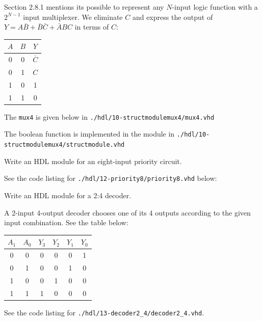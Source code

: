 \documentclass[12pt]{article}
\newenvironment{ex}[2][Exercise]{\begin{trivlist}
		\item[\hskip \labelsep {\bfseries #1}\hskip \labelsep {\bfseries #2.}]}{\end{trivlist}}
\newenvironment{sol}[1][Solution]{\begin{trivlist}
		\item[\hskip \labelsep {\bfseries #1:}]}{\end{trivlist}}
\begin{document}
\begin{sol}
	Section 2.8.1 mentions its possible to represent any $N$-input
	logic function with a $2^{N-1}$ input multiplexer. We eliminate $C$
	and express the output of $Y=A\bar{B}+\bar{B}\bar{C}+\bar{A}BC$ in terms of $C$:
	\begin{center}
		\begin{tabular}{cc|c}
			$A$ & $B$ & $Y$\\
			\hline
			0 & 0 & $\overline{C}$\\
			0 & 1 & $C$\\
			1 & 0 & 1\\
			1 & 1 & 0\\   
		\end{tabular} 
	\end{center}
	The \texttt{mux4} is given below in \texttt{./hdl/10-structmodulemux4/mux4.vhd}
	
	The boolean function is implemented in the module in
	\texttt{./hdl/10-structmodulemux4/structmodule.vhd}
	
\end{sol}

\begin{ex}{4.12}
	Write an HDL module for an eight-input priority circuit.
\end{ex}

\begin{sol}
	See the code listing for \texttt{./hdl/12-priority8/priority8.vhd} below:
	
\end{sol}

\begin{ex}{4.13}
	Write an HDL module for a 2:4 decoder.
\end{ex}

\begin{sol}
	A 2-input 4-output decoder chooses one of its 4 outputs according to
	the given input combination. See the table below:
	\begin{center}
		\begin{tabular}{cc|cccc}
			$A_1$ & $A_0$ & $Y_3$ & $Y_2$ & $Y_1$ & $Y_0$\\
			\hline
			0 & 0 & 0 & 0 & 0 & 1\\
			0 & 1 & 0 & 0 & 1 & 0\\
			1 & 0 & 0 & 1 & 0 & 0\\
			1 & 1 & 1 & 0 & 0 & 0\\
		\end{tabular}
	\end{center}
	See the code listing for \texttt{./hdl/13-decoder2\_4/decoder2\_4.vhd}.
	
\end{sol}
\end{document}
